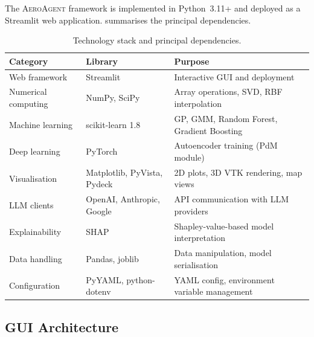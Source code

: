 \documentclass[12pt]{article}
\begin{document}
The \textsc{AeroAgent} framework is implemented in Python~3.11+ and deployed as a Streamlit web application.
 summarises the principal dependencies.

\begin{table}[H]
\centering
\caption{Technology stack and principal dependencies.}
\label{tab:tech_stack}
\small
\begin{tabular}{l l l}
\toprule
\textbf{Category} & \textbf{Library} & \textbf{Purpose} \\
\midrule
Web framework & Streamlit & Interactive GUI and deployment \\
Numerical computing & NumPy, SciPy & Array operations, SVD, RBF interpolation \\
Machine learning & scikit-learn 1.8 & GP, GMM, Random Forest, Gradient Boosting \\
Deep learning & PyTorch & Autoencoder training (PdM module) \\
Visualisation & Matplotlib, PyVista, Pydeck & 2D plots, 3D VTK rendering, map views \\
LLM clients & OpenAI, Anthropic, Google & API communication with LLM providers \\
Explainability & SHAP & Shapley-value-based model interpretation \\
Data handling & Pandas, joblib & Data manipulation, model serialisation \\
Configuration & PyYAML, python-dotenv & YAML config, environment variable management \\
\bottomrule
\end{tabular}
\end{table}

\subsection{GUI Architecture}
\end{document}
